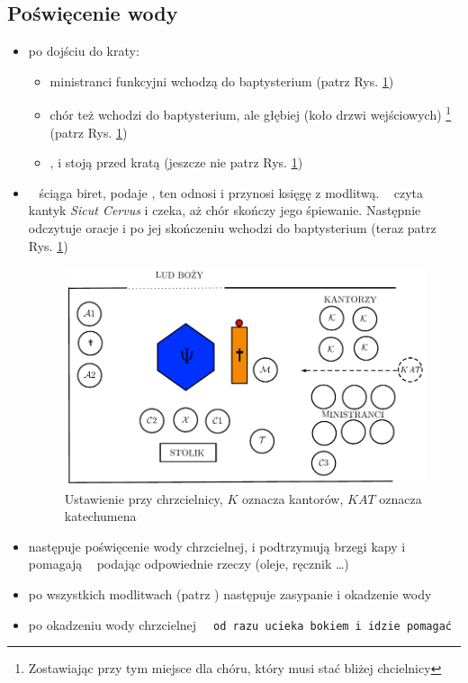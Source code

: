 \subsection{Poświęcenie wody}
\begin{itemize}
	\item po dojściu do kraty:
	      \begin{itemize}
		      \item ministranci funkcyjni wchodzą do baptysterium (patrz Rys.
		            \ref{fig:woda})
		      \item chór też wchodzi do baptysterium, ale głębiej (koło drzwi
		            wejściowych) \footnote{Zostawiając przy tym miejsce dla
			            chóru, który musi stać bliżej chcielnicy} (patrz Rys.
		            \ref{fig:woda})
		      \item \ii,  i  stoją przed kratą (jeszcze nie patrz Rys.
		            \ref{fig:woda})
	      \end{itemize}
	\item \ii~ ściąga biret, podaje , ten odnosi i przynosi księgę z
	      modlitwą. \ii~ czyta kantyk \textit{Sicut Cervus} i czeka, aż chór
	      skończy jego śpiewanie. Następnie odczytuje oracje i po jej skończeniu
	      wchodzi do baptysterium (teraz patrz Rys. \ref{fig:woda})
	      \begin{figure}[h!]
		      \centering
		      \includegraphics[width=0.7\linewidth]{Figures/Sobota/woda.pdf}
		      \caption{Ustawienie przy chrzcielnicy, $K$ oznacza kantorów, $KAT$
			      oznacza katechumena}
		      \label{fig:woda}
	      \end{figure}
	\item następuje poświęcenie wody chrzcielnej,  i  podtrzymują brzegi
	      kapy i pomagają \ii~ podając odpowiednie rzeczy (oleje, ręcznik \dots)
	\item po wszystkich modlitwach (patrz \textit{}) następuje
	      zasypanie i okadzenie wody
	\item po okadzeniu wody chrzcielnej \tt~ od razu ucieka bokiem i idzie
	      pomagać 
\end{itemize}
